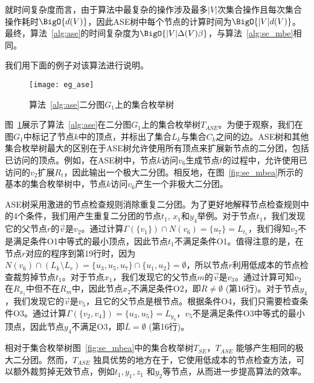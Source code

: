 就时间复杂度而言，由于算法中最复杂的操作涉及最多$|V|$次集合操作且每次集合操作耗时$\BigO{d(V)}$，因此ASE树中每个节点的计算时间为$\BigO{|V|d(V)}$。最终，算法~\ref{alg:ase}的时间复杂度为$\BigO{|V|\Delta(V)\beta}$，与算法~\ref{alg:se_mbe}相同。

我们用下面的例子对该算法进行说明。

\begin{figure} [ht]
  \vspace{0.1 in}
  \centering
  \texttt{[image: eg\_ase]}
  \vspace{0.1 in}
  \caption{算法~\ref{alg:ase}二分图$G_1$上的集合枚举树}
  \label{fig:ase}
\end{figure}

\begin{example}
  \label{example:ase}
  图~\ref{fig:ase}展示了算法~\ref{alg:ase}在二分图$G_1$上的集合枚举树$T_{ASE}$。为便于观察，我们在图$G_1$中标记了节点$k$中的顶点，并标出了集合$L_k$与集合$C_k$之间的边。ASE树和其他集合枚举树最大的区别在于ASE树允许使用所有顶点来扩展新节点的二分团，包括已访问的顶点。例如，在ASE树中，节点$k$访问$v_6$生成节点$t$的过程中，允许使用已访问的$v_2$扩展$R_t$，因此输出一个极大二分团。相反地，在图~\ref{fig:se_mbea}所示的基本的集合枚举树中，节点$k$访问$v_6$产生一个非极大二分团。

  ASE树采用激进的节点检查规则消除重复二分团。为了更好地解释节点检查规则中的4个条件，我们用产生重复二分团的节点$t_1$, $x_1$和$y_4$举例。对于节点$t_1$，我们发现它的父节点$r$的$\vec{v}$是$v_2$。通过计算$\Gamma(\{v_1\})\cap N(v_6)=\{u_7\} = L_{t_1}$，我们得知$v_2$不是满足条件O1中等式的最小顶点，因此节点$t_1$不满足条件O1。值得注意的是，在节点$r$对应的程序到第19行时，因为$N(v_6) \cap (L_k \setminus L_r) = \{u_3, u_5, u_7\} \cap \{u_1, u_2\} = \emptyset$，所以节点$r$利用低成本的节点检查裁剪掉节点$t_1$。对于节点$x_1$，我们发现它的父节点$m$的$\vec{v}$是$v_3$。通过计算可知$v_2$在$R_{x_1}$中但不在$R_{m}$中，因此节点$x_2$不满足条件O2，即$\overline{R}\neq\emptyset$ (第16行)。对于节点$y_4$，我们发现它的$\vec{v}$是$v_5$，且它的父节点是根节点。根据条件O4，我们只需要检查条件O3。通过计算$\Gamma(\{v_2, v_4\}) = \{u_3, u_5\} = L_{y_4}$，$v_5$不是满足条件O3中等式的最小顶点，因此节点$y_4$不满足O3，即$\overline{L}=\emptyset$ (第16行)。
  
  相对于集合枚举树图~\ref{fig:se_mbea}中的集合枚举树$T_{SE}$，$T_{ASE}$ 能够产生相同的极大二分团。然而，$T_{ASE}$ 独具优势的地方在于，它使用低成本的节点检查方法，可以额外裁剪掉无效节点，例如$t_1, y_1, z_1$ 和$y_2$等节点，从而进一步提高算法的效率。


\end{example}

